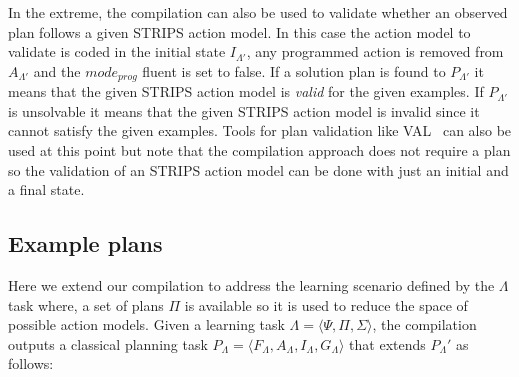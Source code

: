 \documentclass[letterpaper]{article} %
\newcommand{\tup}[1]{{\langle #1 \rangle}}
\begin{document}
In the extreme, the compilation can also be used to validate whether an observed plan follows a given STRIPS action model. In this case the action model to validate is coded in the initial state $I_{\Lambda'}$, any programmed action is removed from $A_{\Lambda'}$ and the $mode_{prog}$ fluent is set to false. If a solution plan is found to $P_{\Lambda'}$ it means that the given STRIPS action model is {\em valid} for the given examples. If $P_{\Lambda'}$ is unsolvable it means that the given STRIPS action model is invalid since it cannot satisfy the given examples. Tools for plan validation like VAL~\cite{howey2004val} can also be used at this point but note that the compilation approach does not require a plan so the validation of an STRIPS action model can be done with just an initial and a final state.

\subsection{Example plans}
Here  we extend our compilation to address the learning scenario defined by the $\Lambda$ task where, a set of plans $\Pi$ is available so it is used to reduce the space of possible action models. Given a learning task $\Lambda=\tup{\Psi,\Pi,\Sigma}$, the compilation outputs a classical planning task $P_{\Lambda}=\tup{F_{\Lambda},A_{\Lambda},I_{\Lambda},G_{\Lambda}}$ that extends $P_{\Lambda}'$ as follows: 
\end{document}
